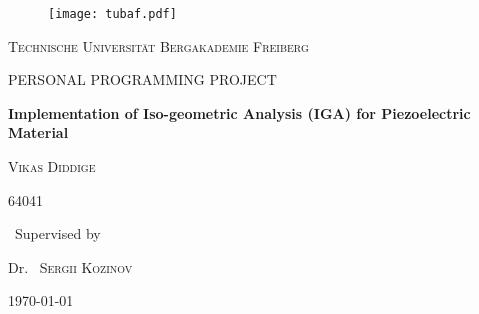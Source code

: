 \documentclass[11pt]{article}
\begin{document}
\begin{titlepage}
	\centering
	
	\begin{figure}
		\begin{center}
			\texttt{[image: tubaf.pdf]}  
		\end{center}
		
	\end{figure}
	

	
	
	
	{\scshape\LARGE Technische Universit\"at Bergakademie Freiberg \par}
	\vspace{1cm}
	{\scshape\Large PERSONAL PROGRAMMING PROJECT\par}
	\vspace{1.5cm}
	{\huge\bfseries Implementation of Iso-geometric Analysis (IGA) for
		Piezoelectric Material \par}
	\vspace{2cm}
	{\scshape\Large Vikas Diddige\par}
	{\scshape\Large 64041\par}
	\vfill
	{\normalsize\ Supervised by\par}
	
	Dr.~ \textsc{Sergii Kozinov}
	
	\vfill
	
	{\large \today\par}
\end{titlepage}

\clearpage

\newpage
\clearpage
\tableofcontents
\clearpage

\vspace*{1cm}
\end{document}

